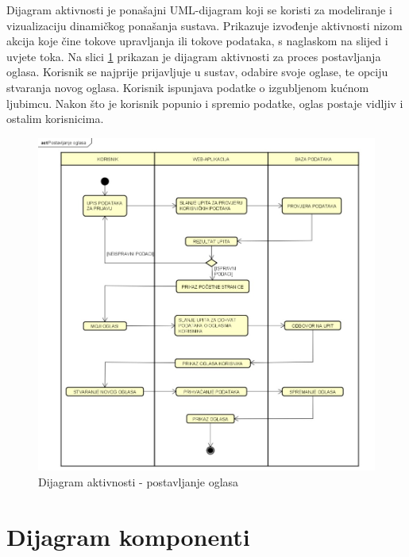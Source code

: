 			 Dijagram aktivnosti je ponašajni UML-dijagram koji se koristi za modeliranje i vizualizaciju dinamičkog ponašanja sustava. Prikazuje izvođenje aktivnosti nizom akcija koje čine tokove upravljanja ili tokove podataka, s naglaskom na slijed i uvjete toka. Na slici \ref{fig:dijagramaktivnosti} prikazan je dijagram aktivnosti za proces postavljanja oglasa. Korisnik se najprije prijavljuje u sustav, odabire svoje oglase, te opciju stvaranja novog oglasa. Korisnik ispunjava podatke o izgubljenom kućnom ljubimcu. Nakon što je korisnik popunio i spremio podatke, oglas postaje vidljiv i ostalim korisnicima.
			
			\begin{figure}[H]
				\includegraphics[width=\textwidth]{dijagram_aktivnosti.JPEG}
				\centering
				\caption{Dijagram aktivnosti - postavljanje oglasa}
				\label{fig:dijagramaktivnosti}
			\end{figure}
			
			\eject
		\section{Dijagram komponenti}
		
		
			 
